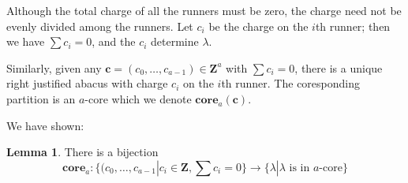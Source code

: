 \documentclass{amsart}[12pt]
\theoremstyle{definition}
\newtheorem{lemma}[dummy]{Lemma}
\newcommand{\Z}{\mathbf{Z}}
\newcommand{\core}{\mathbf{core}}
\begin{document}
  Although the total charge of all the runners must be zero, the charge need not be evenly divided among the runners.  Let
$c_i$ be the charge on the $i$th runner; then we have $\sum c_i=0$, and the $c_i$ determine $\lambda$.

Similarly, given any $\mathbf{c}=(c_0,\dots,c_{a-1})\in\Z^a$ with $\sum c_i=0$, there is a unique right justified abacus with charge  $c_i$ on the $i$th runner.  The coresponding partition is an $a$-core which we denote $\core_a(\mathbf{c})$.

We have shown:

\begin{lemma}
There is a bijection $$\core_a:\{(c_0,\dots,c_{a-1}|c_i\in\Z, \sum c_i=0\}\to \{\lambda | \lambda \text{ is in $a$-core} \}$$
\end{lemma}
\end{document}
